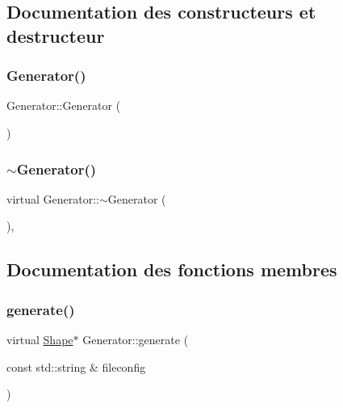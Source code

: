 \subsection{Documentation des constructeurs et destructeur}
\mbox{\label{class_generator_aae25f1e872541b353e40fb0e4ee0dd45}} 
\subsubsection{\texorpdfstring{Generator()}{Generator()}}
{\footnotesize\ttfamily Generator\+::\+Generator (\begin{DoxyParamCaption}{ }\end{DoxyParamCaption})\hspace{0.3cm}{\ttfamily [default]}}

\mbox{\label{class_generator_a175792ff2622a6ce48bf2adab7e09e58}} 
\subsubsection{\texorpdfstring{$\sim$\+Generator()}{~Generator()}}
{\footnotesize\ttfamily virtual Generator\+::$\sim$\+Generator (\begin{DoxyParamCaption}{ }\end{DoxyParamCaption})\hspace{0.3cm}{\ttfamily [virtual]}, {\ttfamily [default]}}



\subsection{Documentation des fonctions membres}
\mbox{\label{class_generator_a0a421843bba544df32c3e10478eaabc7}} 
\subsubsection{\texorpdfstring{generate()}{generate()}}
{\footnotesize\ttfamily virtual \hyperlink{class_shape}{Shape}$\ast$ Generator\+::generate (\begin{DoxyParamCaption}\item[{const std\+::string \&}]{fileconfig }\end{DoxyParamCaption})\hspace{0.3cm}{\ttfamily [pure virtual]}}



